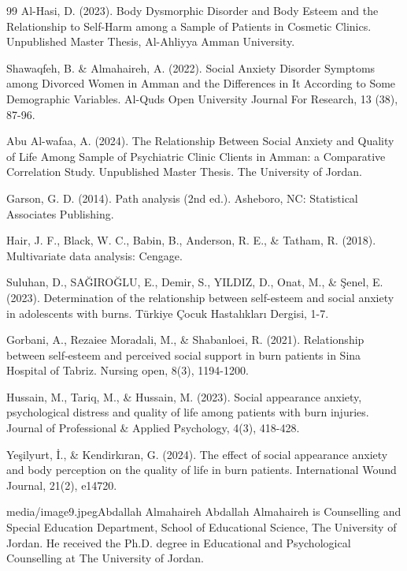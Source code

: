 \documentclass[10pt]{NSP1}
\begin{document}
\begin{thebibliography}{99}
Al-Hasi, D. (2023). Body Dysmorphic Disorder and Body Esteem and the Relationship to Self-Harm among a Sample of Patients in Cosmetic Clinics. Unpublished Master Thesis, Al-Ahliyya Amman University.

Shawaqfeh, B. \& Almahaireh, A. (2022). Social Anxiety Disorder Symptoms among Divorced Women in Amman and the Differences in It According to Some Demographic Variables. Al-Quds Open University Journal For Research, 13 (38), 87-96.

Abu Al-wafaa, A. (2024). The Relationship Between Social Anxiety and Quality of Life Among Sample of Psychiatric Clinic Clients in Amman: a Comparative Correlation Study. Unpublished Master Thesis. The University of Jordan.

Garson, G. D. (2014). Path analysis (2nd ed.). Asheboro, NC: Statistical Associates Publishing.

Hair, J. F., Black, W. C., Babin, B., Anderson, R. E., \& Tatham, R. (2018). Multivariate data analysis: Cengage.

Suluhan, D., SAĞIROĞLU, E., Demir, S., YILDIZ, D., Onat, M., \& Şenel, E. (2023). Determination of the relationship between self-esteem and social anxiety in adolescents with burns. Türkiye Çocuk Hastalıkları Dergisi, 1-7.

Gorbani, A., Rezaiee Moradali, M., \& Shabanloei, R. (2021). Relationship between self‐esteem and perceived social support in burn patients in Sina Hospital of Tabriz. Nursing open, 8(3), 1194-1200.

Hussain, M., Tariq, M., \& Hussain, M. (2023). Social appearance anxiety, psychological distress and quality of life among patients with burn injuries. Journal of Professional \& Applied Psychology, 4(3), 418-428.

Yeşilyurt, İ., \& Kendirkıran, G. (2024). The effect of social appearance anxiety and body perception on the quality of life in burn patients. International Wound Journal, 21(2), e14720.

\end{thebibliography}




\begin{biographyps}{media/image9.jpeg}{Abdallah Almahaireh}
Abdallah Almahaireh is Counselling and Special Education Department, School of Educational Science, The University of Jordan. He received the Ph.D. degree in Educational and Psychological Counselling at The University of Jordan.\end{biographyps}
\end{document}
